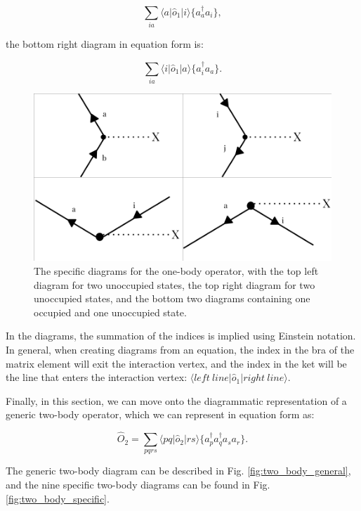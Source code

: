 \begin{equation}
    \sum_{ia} \langle a | \hat{o}_1 | i \rangle \{a^\dagger_aa_i\},
\end{equation}

the bottom right diagram in equation form is:

\begin{equation}
    \sum_{ia} \langle i | \hat{o}_1 | a \rangle \{a^\dagger_ia_a\}.
\end{equation}

\begin{figure}
    \centering
    \includegraphics[scale=0.5]{Images/Chapter2/one_body_specific.png}
    \caption{The specific diagrams for the one-body operator, with the top left diagram for two unoccupied states, the top right diagram for two unoccupied states, and the bottom two diagrams containing one occupied and one unoccupied state.}
    \label{fig:one_body_specific}
\end{figure}

In the diagrams, the summation of the indices is implied using Einstein notation. In general, when creating diagrams from an equation, the index in the bra of the matrix element will exit the interaction vertex, and the index in the ket will be the line that enters the interaction vertex: $\langle left\ line | \hat{o}_1 | right\ line \rangle$.  

Finally, in this section, we can move onto the diagrammatic representation of a generic two-body operator, which we can represent in equation form as:

\begin{equation}
    \hat{O}_2 = \sum_{pqrs}\langle pq | \hat{o}_2 | rs \rangle \{a^\dagger_pa^\dagger_qa_sa_r\}.
\end{equation}

The generic two-body diagram can be described in Fig. \ref{fig:two_body_general}, and the nine specific two-body diagrams can be found in Fig. \ref{fig:two_body_specific}.

